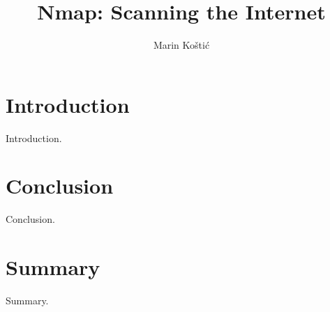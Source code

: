 \documentclass[times, utf8, seminar,english]{fer}
\begin{document}
\title{Nmap: Scanning the Internet}

\author{Marin Koštić}


\maketitle

\tableofcontents

\chapter{Introduction}
Introduction.

\chapter{Conclusion}
Conclusion.




\chapter{Summary}
Summary.
\end{document}
